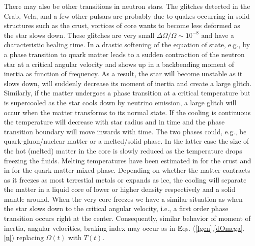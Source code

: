 \begin{multicols}{2}
There may also be other transitions in neutron stars. The glitches 
detected in the Crab, Vela, and a few other pulsars are
probably due to quakes occurring in solid structures such as the
crust, vortices of core \cite{HH} wants to become less deformed as
the star slows down. These glitches are very small
$\Delta\Omega/\Omega\sim 10^{-8}$ and have a characteristic healing
time.  In \cite{GPW} a drastic softening of the equation of state,
e.g., by a phase transition to quark matter leads to a sudden
contraction of the neutron star at a critical angular velocity and
shows up in a backbending moment of inertia as function of
frequency. As a result, the star will become unstable as it slows down,
will suddenly decrease its moment of inertia and create a large
glitch. Similarly, if the matter undergoes a phase
transition at a critical temperature but is supercooled as the star cools down
by neutrino emission, a large glitch will occur when the matter transforms
to its normal state. If the cooling is continuous the temperature will
decrease with star radius and in time and the phase transition boundary
will move inwards with time. The two phases could, e.g., be  
quark-gluon/nuclear matter or a melted/solid phase. In the latter case
the size of the hot (melted) 
matter in the core is slowly reduced as the temperature drops freezing the
fluids. Melting temperatures have been estimated in \cite{LPR,melt} for the
crust and in \cite{HPS} for the quark matter mixed phase.
Depending on whether the matter contracts as it freezes as most terrestial
metals or expands as ice, the cooling will separate the matter in a liquid
core of lower or higher density respectively and a solid mantle around.
When the very core freezes we have a similar situation as when the star
slows down to the critical angular velocity, i.e., a
first order phase transition occurs right at the center. Consequently,
similar behavior of moment of inertia, angular velocities, braking index
may occur as in Eqs. (\ref{Igen},\ref{dOmega},\ref{n}) 
replacing $\Omega(t)$ with $T(t)$.


\end{multicols}
